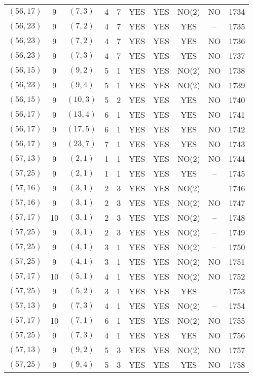 \begin{longtable}{|c|c|c|c|c|c|c|c|c|c|}
$(56, 17)$ & 9 & $(7, 3)$ & 4 & 7 & YES & YES & NO(2) & NO & 1734\\
$(56, 23)$ & 9 & $(7, 2)$ & 4 & 7 & YES & YES & YES & -- & 1735\\
$(56, 23)$ & 9 & $(7, 2)$ & 4 & 7 & YES & YES & YES & NO & 1736\\
$(56, 23)$ & 9 & $(7, 3)$ & 4 & 7 & YES & YES & YES & NO & 1737\\
$(56, 15)$ & 9 & $(9, 2)$ & 5 & 1 & YES & YES & NO(2) & NO & 1738\\
$(56, 23)$ & 9 & $(9, 4)$ & 5 & 1 & YES & YES & NO(2) & NO & 1739\\
$(56, 15)$ & 9 & $(10, 3)$ & 5 & 2 & YES & YES & YES & NO & 1740\\
$(56, 17)$ & 9 & $(13, 4)$ & 6 & 1 & YES & YES & YES & NO & 1741\\
$(56, 17)$ & 9 & $(17, 5)$ & 6 & 1 & YES & YES & YES & NO & 1742\\
$(56, 17)$ & 9 & $(23, 7)$ & 7 & 1 & YES & YES & YES & NO & 1743\\
$(57, 13)$ & 9 & $(2, 1)$ & 1 & 1 & YES & YES & NO(2) & NO & 1744\\
$(57, 25)$ & 9 & $(2, 1)$ & 1 & 1 & YES & YES & YES & -- & 1745\\
$(57, 16)$ & 9 & $(3, 1)$ & 2 & 3 & YES & YES & NO(2) & -- & 1746\\
$(57, 16)$ & 9 & $(3, 1)$ & 2 & 3 & YES & YES & NO(2) & NO & 1747\\
$(57, 17)$ & 10 & $(3, 1)$ & 2 & 3 & YES & YES & NO(2) & -- & 1748\\
$(57, 25)$ & 9 & $(3, 1)$ & 2 & 3 & YES & YES & NO(2) & -- & 1749\\
$(57, 25)$ & 9 & $(4, 1)$ & 3 & 1 & YES & YES & NO(2) & -- & 1750\\
$(57, 25)$ & 9 & $(4, 1)$ & 3 & 1 & YES & YES & NO(2) & NO & 1751\\
$(57, 17)$ & 10 & $(5, 1)$ & 4 & 1 & YES & YES & NO(2) & NO & 1752\\
$(57, 25)$ & 9 & $(5, 2)$ & 3 & 1 & YES & YES & YES & -- & 1753\\
$(57, 13)$ & 9 & $(7, 3)$ & 4 & 1 & YES & YES & NO(2) & -- & 1754\\
$(57, 17)$ & 10 & $(7, 1)$ & 6 & 1 & YES & YES & NO(2) & NO & 1755\\
$(57, 25)$ & 9 & $(7, 3)$ & 4 & 1 & YES & YES & YES & NO & 1756\\
$(57, 13)$ & 9 & $(9, 2)$ & 5 & 3 & YES & YES & NO(2) & NO & 1757\\
$(57, 25)$ & 9 & $(9, 4)$ & 5 & 3 & YES & YES & YES & NO & 1758\\

\end{longtable}
